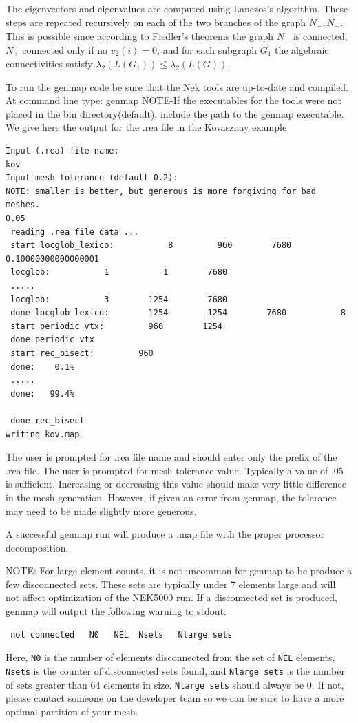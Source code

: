 The eigenvectors and eigenvalues are computed using Lanczos's algorithm.
These steps are repeated recursively on each of the two branches of the graph \(N_{-}, N_{+}\). This is possible since according to Fiedler's theorems the graph \(N_{-}\) is connected, \(N_{+}\) connected only if no \(v_2(i)=0\),  and for each subgraph \(G_1\) the algebraic connectivities satisfy \(\lambda_2(L(G_1))\leq\lambda_2(L(G))\).



To run the genmap code be sure that the Nek tools are up-to-date and compiled. 
At command line type: genmap 
NOTE-If the executables for the tools were not placed in the bin directory(default), 
include the path to the genmap executable. We give here the output for the .rea file in the Kovasznay example
\begin{verbatim}
Input (.rea) file name:
kov
Input mesh tolerance (default 0.2):
NOTE: smaller is better, but generous is more forgiving for bad meshes.
0.05
 reading .rea file data ...
 start locglob_lexico:           8         960        7680  0.10000000000000001     
 locglob:           1           1        7680
 .....
 locglob:           3        1254        7680
 done locglob_lexico:        1254        1254        7680           8
 start periodic vtx:         960        1254
 done periodic vtx
 start rec_bisect:         960
 done:    0.1% 
 .....
 done:   99.4% 
  
 done rec_bisect
writing kov.map    
\end{verbatim}
The user is prompted for .rea file name and should enter only the prefix of the .rea file. 
The user is prompted for mesh tolerance value. Typically a value of .05 is sufficient. Increasing or decreasing this value should make very little difference in the mesh generation. However, if given an error from genmap, the tolerance may need to be made slightly more generous. 

A successful genmap run will produce a .map file with the proper processor decomposition.


NOTE: For large element counts, it is not uncommon for genmap to be produce a few disconnected sets.  
These sets are typically under 7 elements large and  will not affect optimization of the NEK5000 run.  
If a disconnected set is produced, genmap will output the following warning to stdout.
\begin{verbatim}
 not connected   N0   NEL  Nsets   Nlarge sets
\end{verbatim}  
Here, {\tt N0} is the number of elements disconnected from the set of {\tt NEL} elements, {\tt Nsets} is the counter of disconnected sets found, 
and {\tt Nlarge sets} is the number of sets greater than 64 elements in size.  {\tt Nlarge sets} should always be 0.  If not, please contact someone on the developer team so we can be sure to have a more optimal partition of your mesh.

